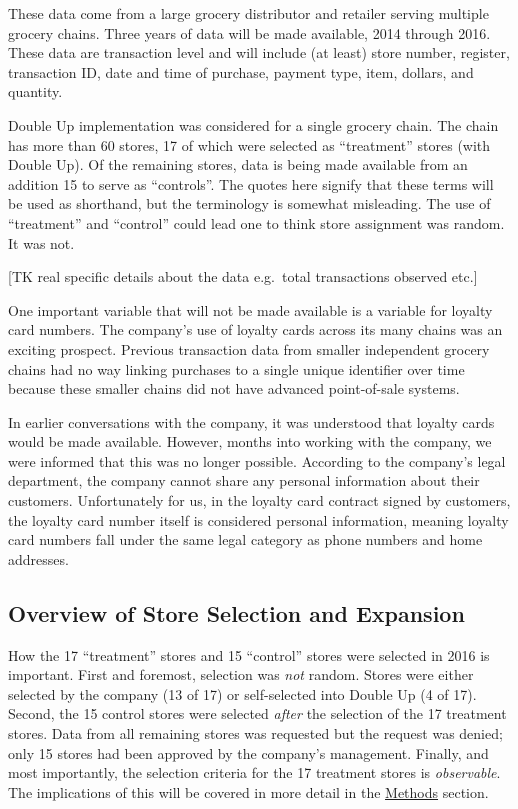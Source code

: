\documentclass[12pt,letterpaperpaper,]{book}
\begin{document}
These data come from a large grocery distributor and retailer serving
multiple grocery chains. Three years of data will be made available,
2014 through 2016. These data are transaction level and will include (at
least) store number, register, transaction ID, date and time of
purchase, payment type, item, dollars, and quantity.

Double Up implementation was considered for a single grocery chain. The
chain has more than 60 stores, 17 of which were selected as
``treatment'' stores (with Double Up). Of the remaining stores, data is
being made available from an addition 15 to serve as ``controls''. The
quotes here signify that these terms will be used as shorthand, but the
terminology is somewhat misleading. The use of ``treatment'' and
``control'' could lead one to think store assignment was random. It was
not.

{[}TK real specific details about the data e.g.~total transactions
observed etc.{]}

One important variable that will not be made available is a variable for
loyalty card numbers. The company's use of loyalty cards across its many
chains was an exciting prospect. Previous transaction data from smaller
independent grocery chains had no way linking purchases to a single
unique identifier over time because these smaller chains did not have
advanced point-of-sale systems.

In earlier conversations with the company, it was understood that
loyalty cards would be made available. However, months into working with
the company, we were informed that this was no longer possible.
According to the company's legal department, the company cannot share
any personal information about their customers. Unfortunately for us, in
the loyalty card contract signed by customers, the loyalty card number
itself is considered personal information, meaning loyalty card numbers
fall under the same legal category as phone numbers and home addresses.

\subsection*{Overview of Store Selection and
Expansion}\label{overview-of-store-selection-and-expansion}

How the 17 ``treatment'' stores and 15 ``control'' stores were selected
in 2016 is important. First and foremost, selection was \emph{not}
random. Stores were either selected by the company (13 of 17) or
self-selected into Double Up (4 of 17). Second, the 15 control stores
were selected \emph{after} the selection of the 17 treatment stores.
Data from all remaining stores was requested but the request was denied;
only 15 stores had been approved by the company's management. Finally,
and most importantly, the selection criteria for the 17 treatment stores
is \emph{observable}. The implications of this will be covered in more
detail in the \protect\hyperlink{methods}{Methods} section.
\end{document}
